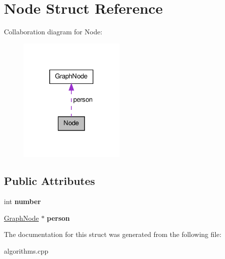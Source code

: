 \hypertarget{structNode}{\section{\-Node \-Struct \-Reference}
\label{structNode}
}


\-Collaboration diagram for \-Node\-:\nopagebreak
\begin{figure}[H]
\begin{center}
\leavevmode
\includegraphics[width=146pt]{structNode__coll__graph}
\end{center}
\end{figure}
\subsection*{\-Public \-Attributes}
\begin{DoxyCompactItemize}
\item 
\hypertarget{structNode_af5dfeb66f4098a82918aa3af132ac91f}{int {\bfseries number}}\label{structNode_af5dfeb66f4098a82918aa3af132ac91f}

\item 
\hypertarget{structNode_aaec09dcf696168f96086ed3e7f6d96ea}{\hyperlink{structGraphNode}{\-Graph\-Node} $\ast$ {\bfseries person}}\label{structNode_aaec09dcf696168f96086ed3e7f6d96ea}

\end{DoxyCompactItemize}


\-The documentation for this struct was generated from the following file\-:\begin{DoxyCompactItemize}
\item 
algorithms.\-cpp\end{DoxyCompactItemize}
